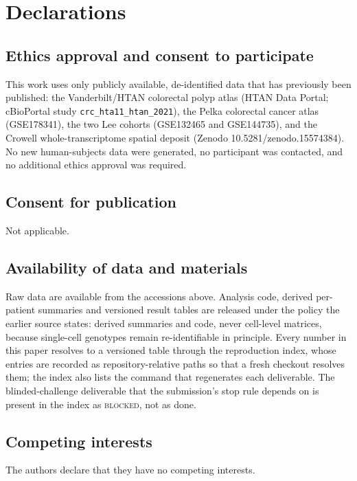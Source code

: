 \section*{Declarations}

\subsection*{Ethics approval and consent to participate}
This work uses only publicly available, de-identified data that has previously
been published: the Vanderbilt/HTAN colorectal polyp atlas (HTAN Data Portal;
cBioPortal study \texttt{crc\_hta11\_htan\_2021}), the Pelka colorectal cancer
atlas (GSE178341), the two Lee cohorts (GSE132465 and GSE144735), and the
Crowell whole-transcriptome spatial deposit (Zenodo 10.5281/zenodo.15574384). No
new human-subjects data were generated, no participant was contacted, and no
additional ethics approval was required.

\subsection*{Consent for publication}
Not applicable.

\subsection*{Availability of data and materials}
Raw data are available from the accessions above. Analysis code, derived
per-patient summaries and versioned result tables are released under the
policy the earlier source states: derived summaries and code, never cell-level
matrices, because single-cell genotypes remain re-identifiable in principle.
Every number in this paper resolves to a versioned table through the
reproduction index, whose entries are recorded as repository-relative paths so
that a fresh checkout resolves them; the index also lists the command that
regenerates each deliverable. The blinded-challenge deliverable that the
submission's stop rule depends on is present in the index as
\textsc{blocked}, not as done.

\subsection*{Competing interests}
The authors declare that they have no competing interests.

